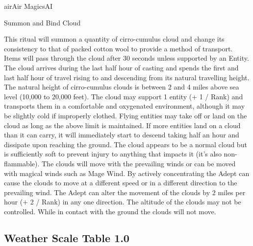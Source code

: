 \begin{college}[2.1]{air}{Air Magics}{AI}
\begin{ritual}[R-4]{Summon and Bind Cloud}

\begin{effects}
This ritual will summon a quantity of cirro-cumulus cloud and change
its consistency to that of packed cotton wool to provide a method of
transport. Items will pass through the cloud after 30 seconds unless
supported by an Entity. The cloud arrives during the last half hour of
casting and spends the first and last half hour of travel rising to
and descending from its natural travelling height. The natural height
of cirro-cumulus clouds is between 2 and 4 miles above sea level
(10,000 to 20,000 feet). The cloud may support 1 entity (+ 1 / Rank)
and transports them in a comfortable and oxygenated environment,
although it may be slightly cold if improperly clothed. Flying
entities may take off or land on the cloud as long as the above limit
is maintained. If more entities land on a cloud than it can carry, it
will immediately start to descend taking half an hour and dissipate
upon reaching the ground. The cloud appears to be a normal cloud but
is sufficiently soft to prevent injury to anything that impacts it
(it's also non-flammable). The clouds will move with the prevailing
winds or can be moved with magical winds such as Mage Wind. By
actively concentrating the Adept can cause the clouds to move at a
different speed or in a different direction to the prevailing
wind. The Adept can alter the movement of the clouds by 2 miles per
hour (+ 2 / Rank) in any one direction. The altitude of the clouds may
not be controlled. While in contact with the ground the clouds will
not move.
\end{effects}
\end{ritual}

\begin{table*}
\subsection{Weather Scale Table 1.0}


\end{table*}
\end{college}
